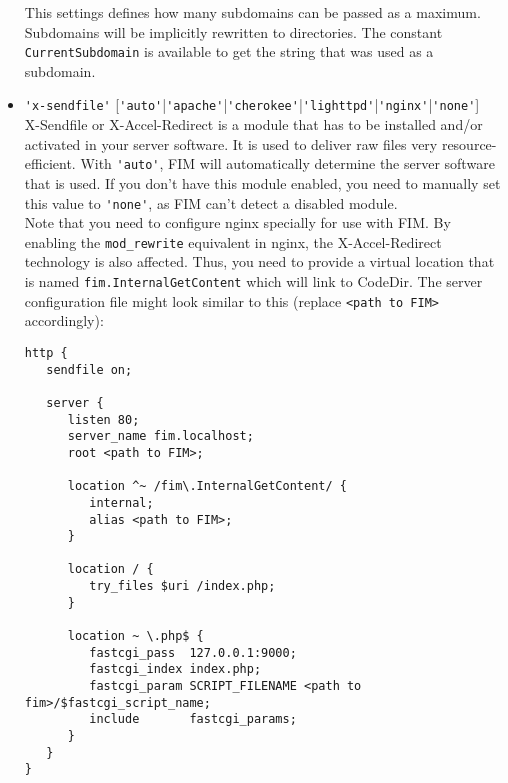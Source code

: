 \documentclass{scrartcl}
\begin{document}
\begin{itemize}
               This settings defines how many subdomains can be passed as a maximum. Subdomains will be implicitly rewritten to directories. The constant \lstinline!CurrentSubdomain! is available to get the string that was used as a subdomain.
            \item \lstinline!'x-sendfile'! [\lstinline!'auto'!|\lstinline!'apache'!|\lstinline!'cherokee'!|\lstinline!'lighttpd'!|\lstinline!'nginx'!|\lstinline!'none'!] \\
               X-Sendfile or X-Accel-Redirect is a module that has to be installed and/or activated in your server software. It is used to deliver raw files very resource-efficient. With \lstinline!'auto'!, FIM will automatically determine the server software that is used. If you don't have this module enabled, you need to manually set this value to \lstinline!'none'!, as FIM can't detect a disabled module. \\
               Note that you need to configure nginx specially for use with FIM. By enabling the \texttt{mod\_rewrite} equivalent in nginx, the X-Accel-Redirect technology is also affected. Thus, you need to provide a virtual location that is named \texttt{fim.InternalGetContent} which will link to CodeDir. The server configuration file might look similar to this (replace \texttt{<path to FIM>} accordingly): \label{nginx}
               \begin{verbatim}
http {
   sendfile on;

   server {
      listen 80;
      server_name fim.localhost;
      root <path to FIM>;

      location ^~ /fim\.InternalGetContent/ {
         internal;
         alias <path to FIM>;
      }

      location / {
         try_files $uri /index.php;
      }

      location ~ \.php$ {
         fastcgi_pass  127.0.0.1:9000;
         fastcgi_index index.php;
         fastcgi_param SCRIPT_FILENAME <path to fim>/$fastcgi_script_name;
         include       fastcgi_params;
      }
   }
}
               \end{verbatim}
         \end{itemize}
\end{document}

